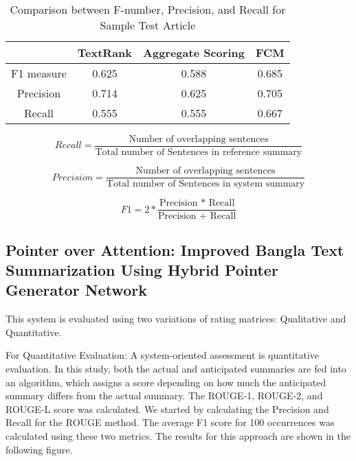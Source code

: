 \documentclass[12pt]{report}
\begin{document}
\begin{table}[H]
\centering
\caption{Comparison between F-number, Precision, and Recall for Sample Test Article}
\begin{tabular}{|c|c|c|c|}
\hline
& TextRank & Aggregate Scoring & FCM \\ \hline
F1 measure & 0.625 & 0.588 & 0.685 \\ \hline
Precision & 0.714 & 0.625 & 0.705 \\ \hline
Recall & 0.555 & 0.555 & 0.667 \\ \hline
\end{tabular}
\label{tab:textrank_fuzzycmeans_metrics}
\end{table}

\begin{equation}
Recall = \frac{\text{Number of overlapping sentences}}{\text{Total number of Sentences in reference summary}}
\end{equation}

\begin{equation}
Precision = \frac{\text{Number of overlapping sentences}}{\text{Total number of Sentences in system summary}}
\end{equation}

\begin{equation}
F1 = 2 * \frac{\text{Precision * Recall}}{\text{Precision + Recall}}
\end{equation}

\subsection*{Pointer over Attention: Improved Bangla Text Summarization Using Hybrid Pointer Generator Network}
This system is evaluated using two variations of rating matrices: Qualitative and Quantitative.

For Quantitative Evaluation: A system-oriented assessment is quantitative evaluation. In this study, both the actual and anticipated summaries are fed into an algorithm, which assigns a score depending on how much the anticipated summary differs from the actual summary. The ROUGE-1, ROUGE-2, and ROUGE-L score was calculated. We started by calculating the Precision and Recall for the ROUGE method. The average F1 score for 100 occurrences was calculated using these two metrics.
The results for this approach are shown in the following figure.
\end{document}
